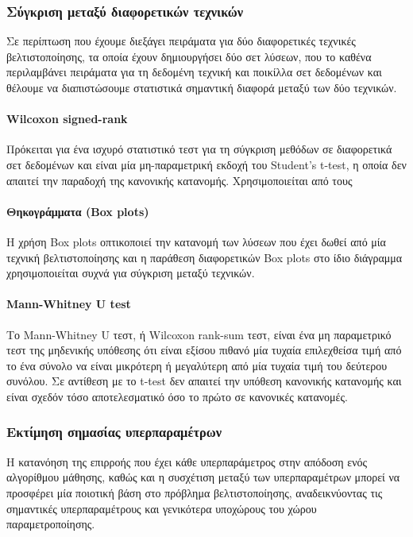 \documentclass[]{article}
\numberwithin{equation}{section}		%
\numberwithin{figure}{section}			%
\numberwithin{table}{section}				%
\begin{document}
	
	
	
	\subsubsection{Σύγκριση μεταξύ διαφορετικών τεχνικών}
	Σε περίπτωση που έχουμε διεξάγει πειράματα για δύο διαφορετικές τεχνικές βελτιστοποίησης, τα οποία έχουν δημιουργήσει δύο σετ λύσεων, που το καθένα περιλαμβάνει πειράματα για τη δεδομένη τεχνική και ποικίλλα σετ δεδομένων και θέλουμε να διαπιστώσουμε στατιστικά σημαντική διαφορά μεταξύ των δύο τεχνικών. 
	
	
	\paragraph{Wilcoxon signed-rank}
	Πρόκειται για ένα ισχυρό στατιστικό τεστ για τη σύγκριση μεθόδων σε διαφορετικά σετ δεδομένων και είναι μία μη-παραμετρική εκδοχή του Student's t-test, η οποία δεν απαιτεί την παραδοχή της κανονικής κατανομής. Xρησιμοποιείται από τους \citet{ensemble}  
	\paragraph{Θηκογράμματα (Box plots)}
	Η χρήση Box plots οπτικοποιεί την κατανομή των λύσεων που έχει δωθεί από μία τεχνική βελτιστοποίησης και η παράθεση διαφορετικών Box plots στο ίδιο διάγραμμα χρησιμοποιείται συχνά \citep{Hutter2011} για σύγκριση μεταξύ τεχνικών. 
	\paragraph{Mann-Whitney U test}
	Το Μann-Whitney U τεστ, ή Wilcoxon rank-sum τεστ, είναι ένα μη παραμετρικό τεστ της μηδενικής υπόθεσης ότι είναι εξίσου πιθανό μία τυχαία επιλεχθείσα τιμή από το ένα σύνολο να είναι μικρότερη ή μεγαλύτερη από μία τυχαία τιμή του δεύτερου συνόλου. Σε αντίθεση με το t-test δεν απαιτεί την υπόθεση κανονικής κατανομής και είναι σχεδόν τόσο αποτελεσματικό όσο το πρώτο σε κανονικές κατανομές. \citep{Hutter2011} \citep{Hutter:2009:EIM:1569901.1569940}
	
	\subsubsection{Εκτίμηση σημασίας υπερπαραμέτρων}
	Η κατανόηση της επιρροής που έχει κάθε υπερπαράμετρος στην απόδοση ενός αλγορίθμου μάθησης, καθώς και η συσχέτιση μεταξύ των υπερπαραμέτρων μπορεί να προσφέρει μία ποιοτική βάση στο πρόβλημα βελτιστοποίησης, αναδεικνύοντας τις σημαντικές υπερπαραμέτρους και γενικότερα υποχώρους του χώρου παραμετροποίησης. 
	
\end{document}
